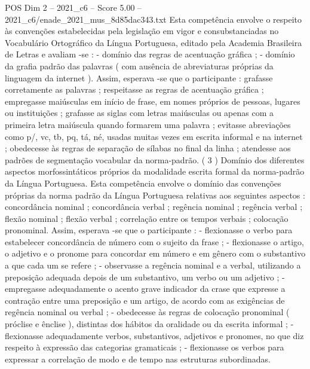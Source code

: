 \begin{textsample}{POS Dim 2 – 2021\_c6 – Score 5.00 – 2021\_c6/enade\_2021\_mus\_8d85dac343.txt}
Esta competência envolve o respeito às convenções estabelecidas pela legislação em vigor e consubstanciadas no Vocabulário Ortográfico da Língua Portuguesa, editado pela Academia Brasileira de Letras e avaliam -se : - domínio das regras de acentuação gráfica ; - domínio da grafia padrão das palavras ( com ausência de abreviaturas próprias da linguagem da internet ).
Assim, esperava -se que o participante : grafasse corretamente as palavras ; respeitasse as regras de acentuação gráfica ; empregasse maiúsculas em início de frase, em nomes próprios de pessoas, lugares ou instituições ; grafasse as siglas com letras maiúsculas ou apenas com a primeira letra maiúscula quando formarem uma palavra ; evitasse abreviações como p/, vc, tb, pq, tá, né, usadas muitas vezes em escrita informal e na internet ; obedecesse às regras de separação de sílabas no final da linha ; atendesse aos padrões de segmentação vocabular da norma-padrão. ( 3 ) Domínio dos diferentes aspectos morfossintáticos próprios da modalidade escrita formal da norma-padrão da Língua Portuguesa.
Esta competência envolve o domínio das convenções próprias da norma padrão da Língua Portuguesa relativas aos seguintes aspectos : concordância nominal ; concordância verbal ; regência nominal ; regência verbal ; flexão nominal ; flexão verbal ; correlação entre os tempos verbais ; colocação pronominal.
Assim, esperava -se que o participante : - flexionasse o verbo para estabelecer concordância de número com o sujeito da frase ; - flexionasse o artigo, o adjetivo e o pronome para concordar em número e em gênero com o substantivo a que cada um se refere ; - observasse a regência nominal e a verbal, utilizando a preposição adequada depois de um substantivo, um verbo ou um adjetivo ; - empregasse adequadamente o acento grave indicador da crase que expresse a contração entre uma preposição e um artigo, de acordo com as exigências de regência nominal ou verbal ; - obedecesse às regras de colocação pronominal ( próclise e ênclise ), distintas dos hábitos da oralidade ou da escrita informal ; - flexionasse adequadamente verbos, substantivos, adjetivos e pronomes, no que diz respeito à expressão das categorias gramaticais ; - flexionasse os verbos para expressar a correlação de modo e de tempo nas estruturas subordinadas.

\end{textsample}
